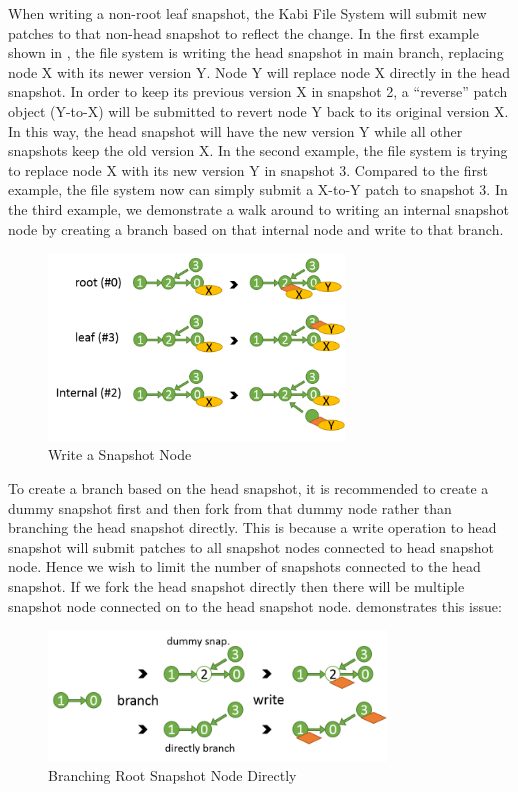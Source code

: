     When writing a non-root leaf snapshot, the Kabi File System will submit new patches to that non-head snapshot to reflect the change. In the first example shown in , the file system is writing the head snapshot in main branch, replacing node X with its newer version Y. Node Y will replace node X directly in the head snapshot. In order to keep its previous version X in snapshot 2, a ``reverse'' patch object (Y-to-X) will be submitted to revert node Y back to its original version X. In this way, the head snapshot will have the new version Y while all other snapshots keep the old version X. In the second example, the file system is trying to replace node X with its new version Y in snapshot 3. Compared to the first example, the file system now can simply submit a X-to-Y patch to snapshot 3. In the third example, we demonstrate a walk around to writing an internal snapshot node by creating a branch based on that internal node and write to that branch.

\begin{figure}[hbtp]
\centering
\includegraphics[width=0.7\textwidth]{Chapter-4/figs/fig17.png}
\caption{Write a Snapshot Node}
\label{fig:write_snapshot_node}
\end{figure}

    To create a branch based on the head snapshot, it is recommended to create a dummy snapshot first and then fork from that dummy node rather than branching the head snapshot directly. This is because a write operation to head snapshot will submit patches to all snapshot nodes connected to head snapshot node. Hence we wish to limit the number of snapshots connected to the head snapshot. If we fork the head snapshot directly then there will be multiple snapshot node connected on to the head snapshot node.  demonstrates this issue:

\begin{figure}[hbtp]
\centering
\includegraphics[width=0.8\textwidth]{Chapter-4/figs/fig16.png}
\caption{Branching Root Snapshot Node Directly}
\label{fig:dummy_node}
\end{figure}

